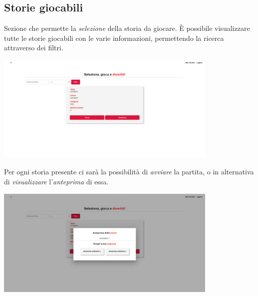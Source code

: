 \documentclass{article}
\begin{document}
\subsection*{Storie giocabili}
Sezione che permette la \textit{selezione} della storia da giocare. È possibile visualizzare tutte le storie giocabili con le varie informazioni, permettendo la ricerca attraverso dei filtri.
\begin{center}
    \includegraphics[width=0.8\textwidth]{foto21.png}
\end{center}
Per ogni storia presente ci sarà la possibilità di \textit{avviare} la partita, o in alternativa di \textit{visualizzare} l'\textit{anteprima} di essa.
\begin{center}
    \includegraphics[width=0.8\textwidth]{foto22.png}
\end{center}
\end{document}
